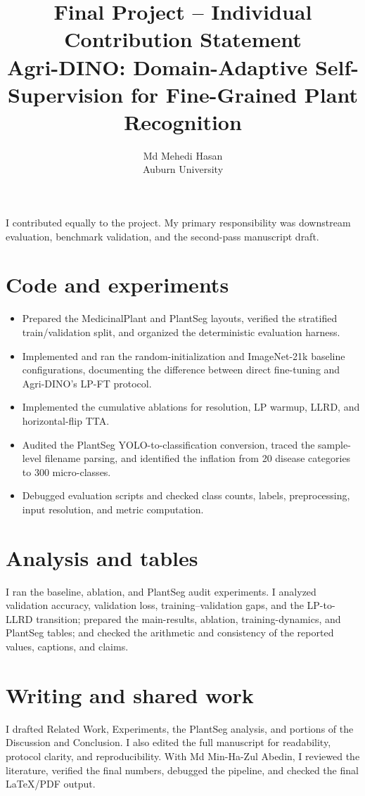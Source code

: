 \documentclass[11pt]{article}
\title{\textbf{Final Project -- Individual Contribution Statement}\\[0.4em]
       \large Agri-DINO: Domain-Adaptive Self-Supervision for Fine-Grained Plant Recognition}
\author{Md Mehedi Hasan\\
Auburn University}
\date{}
\begin{document}
\maketitle

I contributed equally to the project. My primary responsibility was downstream
evaluation, benchmark validation, and the second-pass manuscript draft.

\section*{Code and experiments}

\begin{itemize}
  \item Prepared the MedicinalPlant and PlantSeg layouts, verified the
        stratified train/validation split, and organized the deterministic
        evaluation harness.
  \item Implemented and ran the random-initialization and ImageNet-21k baseline
        configurations, documenting the difference between direct fine-tuning
        and Agri-DINO's LP-FT protocol.
  \item Implemented the cumulative ablations for resolution, LP warmup, LLRD,
        and horizontal-flip TTA.
  \item Audited the PlantSeg YOLO-to-classification conversion, traced the
        sample-level filename parsing, and identified the inflation from 20
        disease categories to 300 micro-classes.
  \item Debugged evaluation scripts and checked class counts, labels,
        preprocessing, input resolution, and metric computation.
\end{itemize}

\section*{Analysis and tables}
I ran the baseline, ablation, and PlantSeg audit experiments. I analyzed
validation accuracy, validation loss, training--validation gaps, and the
LP-to-LLRD transition; prepared the main-results, ablation, training-dynamics,
and PlantSeg tables; and checked the arithmetic and consistency of the reported
values, captions, and claims.

\section*{Writing and shared work}
I drafted Related Work, Experiments, the PlantSeg analysis, and portions of the
Discussion and Conclusion. I also edited the full manuscript for readability,
protocol clarity, and reproducibility. With Md Min-Ha-Zul Abedin, I reviewed the
literature, verified the final numbers, debugged the pipeline, and checked the
final LaTeX/PDF output.
\end{document}
